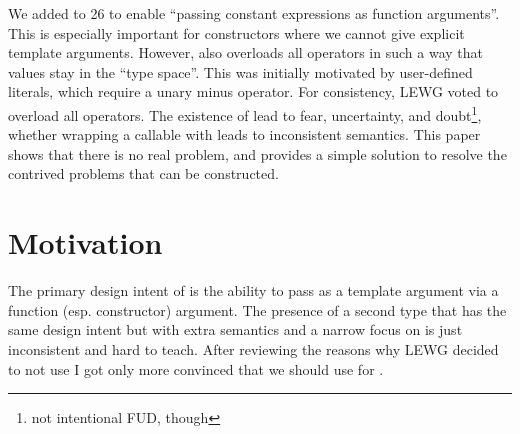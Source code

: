 \newcommand\wgTitle{\code{constant\_wrapper} is the only tool needed for passing constant expressions
  via function arguments}
\newcommand\wgName{Matthias Kretz <m.kretz@gsi.de>}
\newcommand\wgDocumentNumber{P3948R1}
\newcommand\wgGroup{LWG}
\newcommand\wgTarget{\CC{}26}

\usepackage{mymacros}
\usepackage{wg21}
\setcounter{tocdepth}{2} %
\hypersetup{bookmarksdepth=5}
\usepackage{changelog}
\usepackage{underscore}
\usepackage{multirow}



\newcommand\wglink[1]{\href{https://wg21.link/#1}{#1}}

\renewcommand{\lst}[1]{Listing~\ref{#1}}
\renewcommand{\sect}[1]{Section~\ref{#1}}
\renewcommand{\ttref}[1]{Tony~Table~\ref{#1}}
\renewcommand{\tabref}[1]{Table~\ref{#1}}


\begin{wgTitlepage}
  We added  to \CC{}26 to enable “passing constant expressions as
  function arguments”.
  This is especially important for constructors where we cannot give explicit template arguments.
  However,  also overloads all operators in such a way that values stay in
  the “type space”.
  This was initially motivated by user-defined literals, which require a unary minus operator.
  For consistency, LEWG voted to overload all operators.
  The existence of  lead to fear, uncertainty, and
  doubt\footnote{not intentional FUD, though}, whether wrapping a callable with
   leads to inconsistent semantics.
  This paper shows that there is no real problem, and provides a simple solution to resolve the
  contrived problems that can be constructed.
\end{wgTitlepage}

\pagestyle{scrheadings}




\section{Motivation}

The primary design intent of \std{} is the ability to pass  as a
template argument via a function (esp. constructor) argument.
The presence of a second type \std{} that has the same design intent but with extra
semantics and a narrow focus on \std{} is just inconsistent and hard to teach.
After reviewing the reasons why LEWG decided to not use \std{} I got only more
convinced that we should use \std{} for \std{}.


